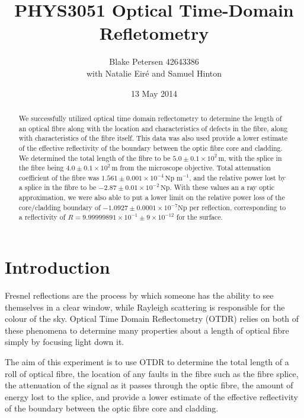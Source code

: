 

\usepackage{graphicx}
\usepackage{epstopdf}


\title{PHYS3051 Optical Time-Domain Refletometry}
\author{Blake Petersen 42643386 \\ 
	\small{with Natalie Eir\'{e} 
	and Samuel Hinton}}
\date{13 May 2014}

\maketitle 

\begin{abstract}
We successfully utilized optical time domain reflectometry to determine the length of an optical fibre along with the location and characteristics of defects in the fibre, along with characteristics of the fibre itself. This data was also used provide a lower estimate of the effective reflectivity of the boundary between the optic fibre core and cladding.
We determined the total length of the fibre to be $5.0 \pm 0.1 \times 10^{2} \,\text{m}$, with the splice in the fibre being $4.0 \pm 0.1 \times 10^{2} \,\text{m}$ from the microscope objective.
Total attenuation coefficient of the fibre was $1.561 \pm 0.001 \times 10^{-4}\, \text{Np m}^{-1}$, and the relative power lost by a splice in the fibre to be $-2.87 \pm 0.01 \times 10^{-2}\,\text{Np}$.
With these values an a ray optic approximation, we were also able to put a lower limit on the relative power loss of the core/cladding boundary of
$-1.0927 \pm 0.0001 \times 10^{-7} \text{Np}$ per reflection, 
corresponding to a reflectivity of $R = 9.99999891 \times 10^{-1} \pm 9 \times 10^{-12}$ for the surface.
\end{abstract}

\section{Introduction}
Fresnel reflections are the process by which someone has the ability to see themselves in a clear window, while Rayleigh scattering is responsible for the colour of the sky. Optical Time Domain Reflectometry (OTDR) relies on both of these phenomena to determine many properties about a length of optical fibre simply by focusing light down it.

The aim of this experiment is to use OTDR to determine the total length of a roll of optical fibre, the location of any faults in the fibre such as the fibre splice, the attenuation of the signal as it passes through the optic fibre, the amount of energy lost to the splice, and provide a lower estimate of the effective reflectivity of the boundary between the optic fibre core and cladding.

